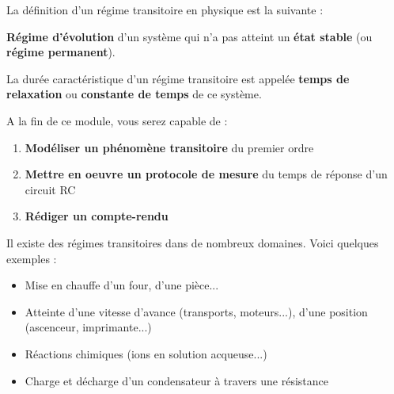\documentclass[10pt]{article} %
\begin{document}
\begin{minipage}[t]{.33\linewidth}
\begin{minipage}[t]{.65\linewidth}
La définition d'un régime transitoire en physique est la suivante :

\begin{mdframed}[style=aavbox,frametitle={Régime transitoire}]
\textbf{Régime d'évolution} d'un système qui n'a pas atteint un \textbf{état stable} (ou \textbf{régime permanent}).
\end{mdframed}

La durée caractéristique d'un régime transitoire est appelée \textbf{temps de relaxation} ou \textbf{constante de temps} de ce système.


\bigskip


\begin{mdframed}[style=aavbox,frametitle={Acquis d'Apprentissage Visés}]

A la fin de ce module, vous serez capable de :

\begin{enumerate}
\item \textbf{Modéliser un phénomène transitoire} du premier ordre
\item \textbf{Mettre en oeuvre un protocole de mesure} du temps de réponse d'un circuit RC
\item \textbf{Rédiger un compte-rendu}
\end{enumerate}
\end{mdframed}


\hypertarget{exemples}{} %

Il existe des régimes transitoires dans de nombreux domaines. Voici quelques exemples :

\begin{itemize}
	\item Mise en chauffe d'un four, d'une pièce...
	\item Atteinte d'une vitesse d'avance (transports, moteurs...), d'une position (ascenceur, imprimante...)
	\item Réactions chimiques (ions en solution acqueuse...)
	\item Charge et décharge d'un condensateur à travers une résistance	
\end{itemize}



\end{minipage}
\end{minipage}
\end{document}
